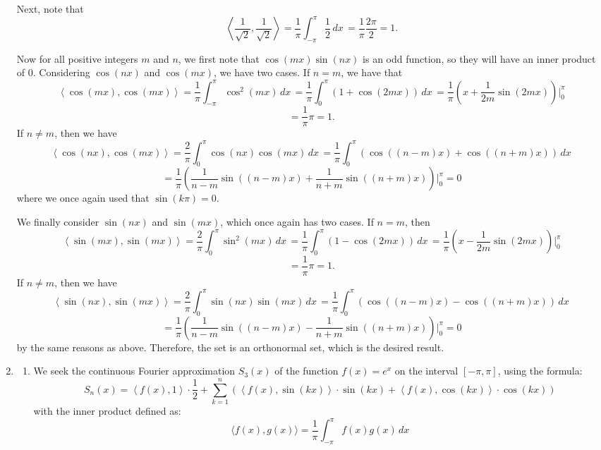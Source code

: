 \documentclass[12pt]{article}
\begin{document}
\begin{enumerate}[leftmargin=0em]
    \smallskip

    \noindent Next, note that 
    \[\left\langle \frac{1}{\sqrt{2}},\frac{1}{\sqrt{2}}\right\rangle=\frac{1}{\pi}\int_{-\pi}^{\pi}\frac{1}{2}\, dx\, = \frac{1}{\pi}\frac{2\pi}{2} =1.\]

    \bigskip

    \noindent Now for all positive integers $m$ and $n$, we first note that $\cos(mx)\sin(nx)$ is an odd function, so they will have an inner product of $0$. Considering $\cos(nx)$ and $\cos(mx)$, we have two cases. If $n=m$, we have that
    \[\left\langle \cos(mx), \cos(mx) \right\rangle=\frac{1}{\pi}\int_{-\pi}^{\pi}\cos^2(mx)\, dx\, = \frac{1}{\pi}\int_{0}^{\pi}\left(1+\cos(2mx)\right)\, dx\, =\frac{1}{\pi}\left(x+\frac{1}{2m}\sin(2mx)\right)\bigg\rvert_{0}^{\pi}\]
    \[=\frac{1}{\pi}\pi = 1.\]
    If $n\neq m$, then we have
    \[\left\langle \cos(nx), \cos(mx) \right\rangle=\frac{2}{\pi}\int_{0}^{\pi}\cos(nx)\cos(mx)\, dx\, = \frac{1}{\pi}\int_{0}^{\pi} \left(\cos((n-m)x)+\cos((n+m)x)\right)\, dx\,\]
    \[=\frac{1}{\pi}\left(\frac{1}{n-m}\sin((n-m)x)+\frac{1}{n+m}\sin((n+m)x)\right)\bigg\rvert_{0}^{\pi} = 0 \]
    where we once again used that $\sin(k\pi)=0$. 

    \smallskip

    \noindent We finally consider $\sin(nx)$ and $\sin(mx)$, which once again has two cases. If $n=m$, then
    \[\left\langle \sin(mx), \sin(mx) \right\rangle=\frac{2}{\pi}\int_{0}^{\pi}\sin^2(mx)\, dx\, = \frac{1}{\pi}\int_{0}^{\pi}\left(1-\cos(2mx)\right)\, dx\, =\frac{1}{\pi}\left(x-\frac{1}{2m}\sin(2mx)\right)\bigg\rvert_{0}^{\pi}\]
    \[=\frac{1}{\pi}\pi = 1.\]
    If $n\neq m$, then we have
    \[\left\langle \sin(nx), \sin(mx) \right\rangle=\frac{2}{\pi}\int_{0}^{\pi}\sin(nx)\sin(mx)\, dx\, = \frac{1}{\pi}\int_{0}^{\pi} \left(\cos((n-m)x)-\cos((n+m)x)\right)\, dx\,\]
    \[=\frac{1}{\pi}\left(\frac{1}{n-m}\sin((n-m)x)-\frac{1}{n+m}\sin((n+m)x)\right)\bigg\rvert_{0}^{\pi} = 0 \]
    by the same reasons as above. Therefore, the set is an orthonormal set, which is the desired result. 

    \item
    \begin{enumerate}[leftmargin=!]
        \item
        We seek the continuous Fourier approximation \( S_3(x) \) of the function \( f(x) = e^x \) on the interval \( [-\pi, \pi] \), using the formula:
        \[S_n(x) = \left\langle f(x), 1 \right\rangle \cdot \frac{1}{2} + \sum_{k=1}^{n} \left( \left\langle f(x), \sin(kx) \right\rangle \cdot \sin(kx) + \left\langle f(x), \cos(kx) \right\rangle \cdot \cos(kx) \right)\]
        with the inner product defined as:
        \[\langle f(x), g(x) \rangle = \frac{1}{\pi} \int_{-\pi}^{\pi} f(x) g(x) \, dx\]


\end{enumerate}
\end{enumerate}
\end{document}
